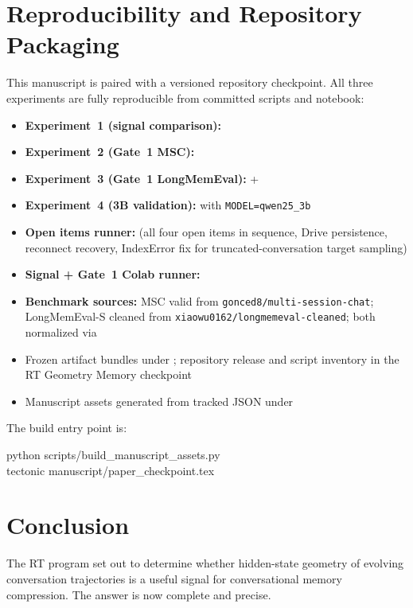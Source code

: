 \documentclass[conference]{IEEEtran}
\begin{document}
\section{Reproducibility and Repository Packaging}
This manuscript is paired with a versioned repository checkpoint. All three experiments are fully reproducible from committed scripts and notebook:

\begin{itemize}[leftmargin=1.4em]
    \item \textbf{Experiment~1 (signal comparison):} 
    \item \textbf{Experiment~2 (Gate~1 MSC):} 
    \item \textbf{Experiment~3 (Gate~1 LongMemEval):}  + 
    \item \textbf{Experiment~4 (3B validation):}  with \texttt{MODEL=qwen25\_3b}
    \item \textbf{Open items runner:}  (all four open items in sequence, Drive persistence, reconnect recovery, IndexError fix for truncated-conversation target sampling)
    \item \textbf{Signal + Gate~1 Colab runner:} 
    \item \textbf{Benchmark sources:} MSC valid from \texttt{gonced8/multi-session-chat}; LongMemEval-S cleaned from \texttt{xiaowu0162/longmemeval-cleaned}; both normalized via 
    \item Frozen artifact bundles under ; repository release and script inventory in the RT Geometry Memory checkpoint \cite{repo}
    \item Manuscript assets generated from tracked JSON under 
\end{itemize}

The build entry point is:
\begin{center}
\ttfamily
python scripts/build\_manuscript\_assets.py\\
tectonic manuscript/paper\_checkpoint.tex
\end{center}

\section{Conclusion}
The RT program set out to determine whether hidden-state geometry of evolving conversation trajectories is a useful signal for conversational memory compression. The answer is now complete and precise.
\end{document}
